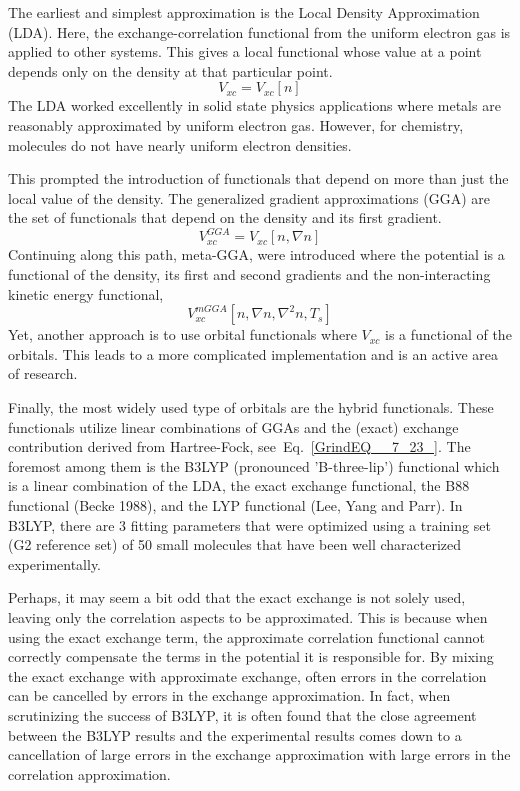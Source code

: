 \documentclass[11pt,oneside,final]{huthesis}%
\begin{document}
The earliest and simplest approximation is the {Local Density Approximation (LDA)}.  Here, the exchange-correlation functional from the uniform electron gas is applied to other systems.  This gives a local functional whose value at a point depends only on the density at that particular point.  
\[ V_{xc}=V_{xc}[n]\]
The LDA worked excellently in solid state physics applications where metals are reasonably approximated by uniform electron gas.  However, for chemistry, molecules do not have nearly uniform electron densities.

This prompted the introduction of functionals that depend on more than just the local value of the density. The {generalized gradient approximations} (GGA) are the set of functionals that depend on the density and its first gradient.
\[V_{xc}^{GGA}=V_{xc}[n,\nabla n]\]
Continuing along this path, {meta-GGA}, were introduced where the potential is a functional of the density, its first and second gradients and the non-interacting kinetic energy functional,
\[V_{xc}^{mGGA}[n,\nabla n, \nabla^2 n, T_s]\]
Yet, another approach is to use orbital functionals where $V_{xc}$ is a functional of the orbitals.  This leads to a more complicated implementation and is an active area of research.

Finally, the most widely used type of orbitals are the {hybrid functionals}.  These functionals utilize linear combinations of GGAs and the (exact) exchange contribution derived from Hartree-Fock, see~Eq.~\eqref{GrindEQ__7_23_}.  The foremost among them is the B3LYP (pronounced 'B-three-lip') functional which is a linear combination of the LDA, the exact exchange functional, the B88 functional (Becke 1988), and the LYP functional (Lee, Yang and Parr).  In B3LYP, there are 3 fitting parameters that were optimized using a training set (G2 reference set) of 50 small molecules that have been well characterized experimentally.  

Perhaps, it may seem a bit odd that the exact exchange is not solely used, leaving only the correlation aspects to be approximated.  This is because when using the exact exchange term, the approximate correlation functional cannot correctly compensate the terms in the potential it is responsible for.  By mixing the exact exchange with approximate exchange, often errors in the correlation can be cancelled by errors in the exchange approximation.  In fact, when scrutinizing the success of B3LYP, it is often found that the close agreement between the B3LYP results and the experimental results comes down to a cancellation of large errors in the exchange approximation with large errors in the correlation approximation.
\end{document}
